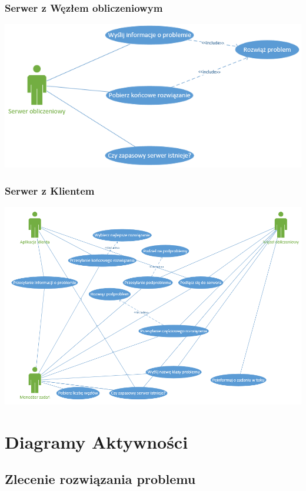 \documentclass[12pt,a4paper,titlepage]{report}
\begin{document}
			
			\subsection{Serwer z Węzłem obliczeniowym}
			
			\includegraphics{img/diagram07.png}	
			
			
			\subsection{Serwer z Klientem}
			
			\includegraphics{img/diagram08.png}	
			
			
			
	\chapter{Diagramy Aktywności}
		\section{Zlecenie rozwiązania problemu}
\end{document}
